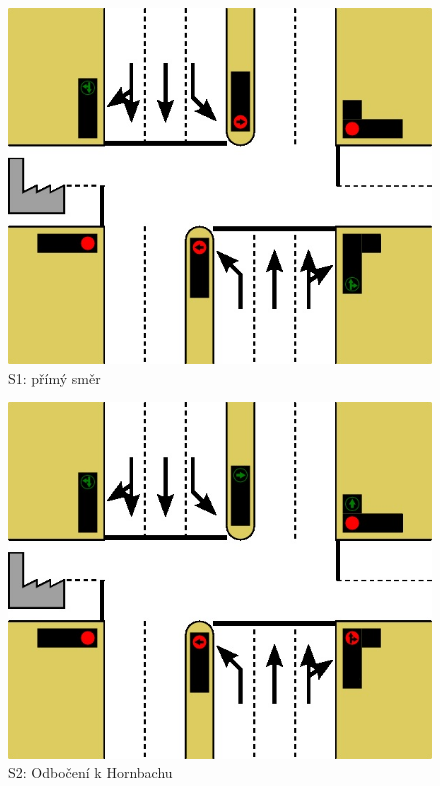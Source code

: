 \documentclass[12pt, a4paper]{report}
\begin{document}
\begin{figure}[!h]
	\centering
		\includegraphics{image/S1_krizovatka.jpg}
	\caption{S1: přímý směr}
	\label{fig:S1_krizovatka}
\end{figure}

\begin{figure}[!h]
	\centering
		\includegraphics{image/S2_krizovatka.jpg}
	\caption{S2: Odbočení k Hornbachu}
	\label{fig:S2_krizovatka}
\end{figure}
\end{document}

